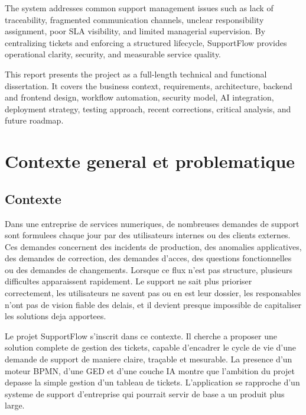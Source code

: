 \documentclass[12pt,a4paper,oneside]{report}
\begin{document}
The system addresses common support management issues such as lack of traceability, fragmented communication channels, unclear responsibility assignment, poor SLA visibility, and limited managerial supervision. By centralizing tickets and enforcing a structured lifecycle, SupportFlow provides operational clarity, security, and measurable service quality.

This report presents the project as a full-length technical and functional dissertation. It covers the business context, requirements, architecture, backend and frontend design, workflow automation, security model, AI integration, deployment strategy, testing approach, recent corrections, critical analysis, and future roadmap.

\tableofcontents
\listoftables
\clearpage


\chapter{Contexte general et problematique}

\section{Contexte}

Dans une entreprise de services numeriques, de nombreuses demandes de support sont formulees chaque jour par des utilisateurs internes ou des clients externes. Ces demandes concernent des incidents de production, des anomalies applicatives, des demandes de correction, des demandes d'acces, des questions fonctionnelles ou des demandes de changements. Lorsque ce flux n'est pas structure, plusieurs difficultes apparaissent rapidement. Le support ne sait plus prioriser correctement, les utilisateurs ne savent pas ou en est leur dossier, les responsables n'ont pas de vision fiable des delais, et il devient presque impossible de capitaliser les solutions deja apportees.

Le projet SupportFlow s'inscrit dans ce contexte. Il cherche a proposer une solution complete de gestion des tickets, capable d'encadrer le cycle de vie d'une demande de support de maniere claire, traçable et mesurable. La presence d'un moteur BPMN, d'une GED et d'une couche IA montre que l'ambition du projet depasse la simple gestion d'un tableau de tickets. L'application se rapproche d'un systeme de support d'entreprise qui pourrait servir de base a un produit plus large.
\end{document}
